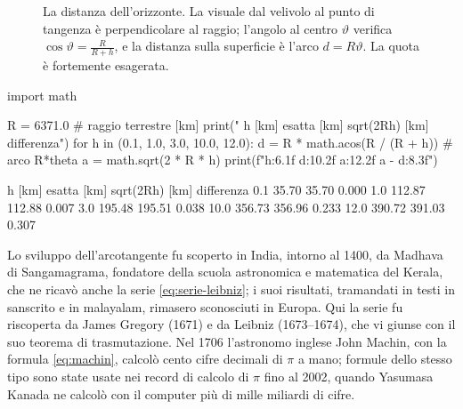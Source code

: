 \begin{figure}[htb]
\centering
{}
\caption{La distanza dell'orizzonte. La visuale dal velivolo al punto di tangenza è
perpendicolare al raggio; l'angolo al centro $\vartheta$ verifica $\cos\vartheta=\frac R{R+h}$, e
la distanza sulla superficie è l'arco $d=R\vartheta$. La quota è fortemente esagerata.}
\label{fig:orizzonte}
\end{figure}

\begin{python}
import math

R = 6371.0                                 # raggio terrestre [km]
print(" h [km]   esatta [km]   sqrt(2Rh) [km]   differenza")
for h in (0.1, 1.0, 3.0, 10.0, 12.0):
    d = R * math.acos(R / (R + h))         # arco R*theta
    a = math.sqrt(2 * R * h)
    print(f"{h:6.1f}   {d:10.2f}    {a:12.2f}     {a - d:8.3f}")
\end{python}
\begin{risultato}
 h [km]   esatta [km]   sqrt(2Rh) [km]   differenza
   0.1        35.70           35.70        0.000
   1.0       112.87          112.88        0.007
   3.0       195.48          195.51        0.038
  10.0       356.73          356.96        0.233
  12.0       390.72          391.03        0.307
\end{risultato}

\begin{notastorica}
Lo sviluppo dell'arcotangente fu scoperto in India, intorno al 1400, da Madhava di
Sangamagrama, fondatore della scuola astronomica e matematica del Kerala, che ne ricavò
anche la serie \eqref{eq:serie-leibniz}; i suoi risultati, tramandati in testi in sanscrito
e in malayalam, rimasero sconosciuti in Europa. Qui la serie fu riscoperta da James Gregory
(1671) e da Leibniz (1673--1674), che vi giunse con il suo teorema di trasmutazione. Nel
1706 l'astronomo inglese John Machin, con la formula \eqref{eq:machin}, calcolò cento
cifre decimali di $\pi$ a mano; formule dello stesso tipo sono state usate nei record di
calcolo di $\pi$ fino al 2002, quando Yasumasa Kanada ne calcolò con il computer più di
mille miliardi di cifre.
\end{notastorica}
